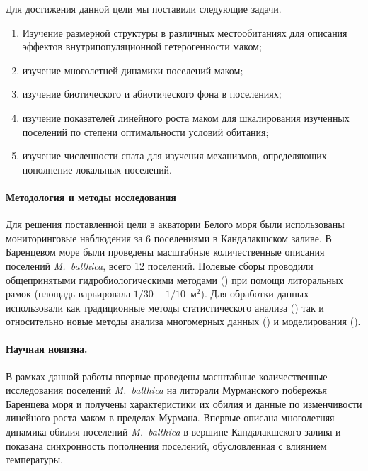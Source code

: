 Для достижения данной цели мы поставили следующие задачи.
  \begin{enumerate}
    \item Изучение размерной %
структуры в различных местообитаниях для описания эффектов внутрипопуляционной гетерогенности маком;
    \item изучение многолетней динамики поселений маком;
    \item изучение биотического и абиотического фона в поселениях;
    \item изучение показателей линейного роста маком для шкалирования изученных поселений по степени оптимальности условий обитания;
    \item изучение численности спата для изучения механизмов, определяющих пополнение локальных поселений.
  \end{enumerate}

\paragraph{Методология и методы исследования}
Для решения поставленной цели в акватории Белого моря были использованы мониторинговые наблюдения за 6 поселениями в Кандалакшском заливе.
В Баренцевом море были проведены масштабные количественные описания поселений {\it M.~balthica}, всего 12 поселений.
Полевые сборы проводили общепринятыми гидробиологическими методами (\cite{Eleftheriou_2013}) при помощи литоральных рамок (площадь варьировала $1/30 - 1/10$~м$^2$).
Для обработки данных использовали как традиционные методы статистического анализа (\cite{Tukey_1977, Mardia_et_al_1979, Chambers_Hastie_1991, Legendre_Legendre_2012, Hollander_et_al_2013}) так и относительно новые методы анализа многомерных данных (\cite{Clarke_et_al_2008}) и моделирования (\cite{Berryman_Turchin_2001}).

\paragraph{Научная новизна.}
В рамках данной работы впервые проведены масштабные количественные исследования поселений \textit{M.~balthica} на литорали Мурманского побережья Баренцева моря и получены характеристики их обилия и данные по изменчивости линейного роста маком в пределах Мурмана.
Впервые описана многолетняя динамика обилия поселений \textit{M.~balthica} в вершине Кандалакшского залива и показана синхронность пополнения поселений, обусловленная с влиянием температуры.

